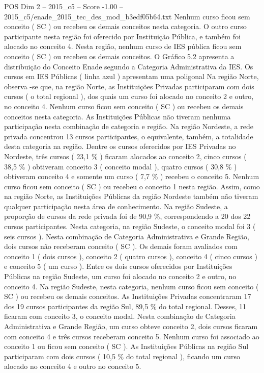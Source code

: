 \begin{textsample}{POS Dim 2 – 2015\_c5 – Score -1.00 – 2015\_c5/enade\_2015\_tec\_des\_mod\_b3edf05b64.txt}
Nenhum curso ficou sem conceito ( SC ) ou recebeu os demais conceitos nesta categoria.
O outro curso participante nesta região foi oferecido por Instituição Pública, e também foi alocado no conceito 4.
Nesta região, nenhum curso de IES pública ficou sem conceito ( SC ) ou recebeu os demais conceitos.
O Gráfico 5.2 apresenta a distribuição do Conceito Enade segundo a Categoria Administrativa da IES.
Os cursos em IES Públicas ( linha azul ) apresentam uma poligonal Na região Norte, observa -se que, na região Norte, as Instituições Privadas participaram com dois cursos ( o total regional ), dos quais um curso foi alocado no conceito 2 e outro, no conceito 4.
Nenhum curso ficou sem conceito ( SC ) ou recebeu os demais conceitos nesta categoria.
As Instituições Públicas não tiveram nenhuma participação nesta combinação de categoria e região.
Na região Nordeste, a rede privada concentrou 13 cursos participantes, o equivalente, também, a totalidade desta categoria na região.
Dentre os cursos oferecidos por IES Privadas no Nordeste, três cursos ( 23,1 \% ) ficaram alocados ao conceito 2, cinco cursos ( 38,5 \% ) obtiveram conceito 3 ( conceito modal ), quatro cursos ( 30,8 \% ) obtiveram conceito 4 e somente um curso ( 7,7 \% ) recebeu o conceito 5.
Nenhum curso ficou sem conceito ( SC ) ou recebeu o conceito 1 nesta região.
Assim, como na região Norte, as Instituições Públicas da região Nordeste também não tiveram qualquer participação nesta área de conhecimento.
Na região Sudeste, a proporção de cursos da rede privada foi de 90,9 \%, correspondendo a 20 dos 22 cursos participantes.
Nesta categoria, na região Sudeste, o conceito modal foi 3 ( seis cursos ).
Nesta combinação de Categoria Administrativa e Grande Região, dois cursos não receberam conceito ( SC ).
Os demais foram avaliados com conceito 1 ( dois cursos ), conceito 2 ( quatro cursos ), conceito 4 ( cinco cursos ) e conceito 5 ( um curso ).
Entre os dois cursos oferecidos por Instituições Públicas na região Sudeste, um curso foi alocado no conceito 2 e outro, no conceito 4.
Na região Sudeste, nesta categoria, nenhum curso ficou sem conceito ( SC ) ou recebeu os demais conceitos.
As Instituições Privadas concentraram 17 dos 19 cursos participantes da região Sul, 89,5 \% do total regional.
Desses, 11 ficaram com conceito 3, o conceito modal.
Nesta combinação de Categoria Administrativa e Grande Região, um curso obteve conceito 2, dois cursos ficaram com conceito 4 e três cursos receberam conceito 5.
Nenhum curso foi associado ao conceito 1 ou ficou sem conceito ( SC ).
As Instituições Públicas na região Sul participaram com dois cursos ( 10,5 \% do total regional ), ficando um curso alocado no conceito 4 e outro no conceito 5.

\end{textsample}
